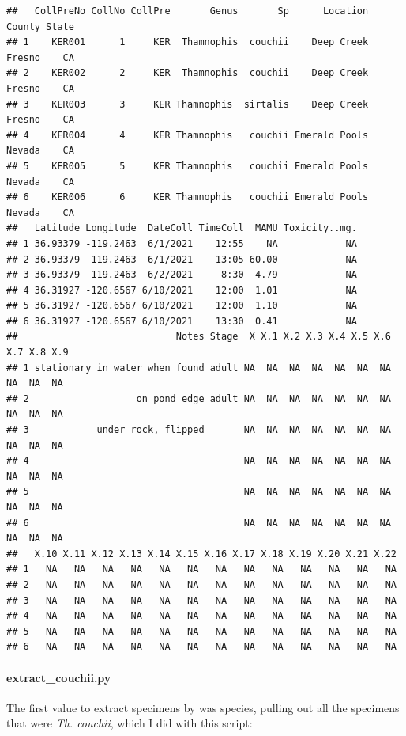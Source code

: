 \documentclass[
]{article}
\begin{document}
\begin{verbatim}
##   CollPreNo CollNo CollPre       Genus       Sp      Location County State
## 1    KER001      1     KER  Thamnophis  couchii    Deep Creek Fresno    CA
## 2    KER002      2     KER  Thamnophis  couchii    Deep Creek Fresno    CA
## 3    KER003      3     KER Thamnophis  sirtalis    Deep Creek Fresno    CA
## 4    KER004      4     KER Thamnophis   couchii Emerald Pools Nevada    CA
## 5    KER005      5     KER Thamnophis   couchii Emerald Pools Nevada    CA
## 6    KER006      6     KER Thamnophis   couchii Emerald Pools Nevada    CA
##   Latitude Longitude  DateColl TimeColl  MAMU Toxicity..mg.
## 1 36.93379 -119.2463  6/1/2021    12:55    NA            NA
## 2 36.93379 -119.2463  6/1/2021    13:05 60.00            NA
## 3 36.93379 -119.2463  6/2/2021     8:30  4.79            NA
## 4 36.31927 -120.6567 6/10/2021    12:00  1.01            NA
## 5 36.31927 -120.6567 6/10/2021    12:00  1.10            NA
## 6 36.31927 -120.6567 6/10/2021    13:30  0.41            NA
##                            Notes Stage  X X.1 X.2 X.3 X.4 X.5 X.6 X.7 X.8 X.9
## 1 stationary in water when found adult NA  NA  NA  NA  NA  NA  NA  NA  NA  NA
## 2                   on pond edge adult NA  NA  NA  NA  NA  NA  NA  NA  NA  NA
## 3            under rock, flipped       NA  NA  NA  NA  NA  NA  NA  NA  NA  NA
## 4                                      NA  NA  NA  NA  NA  NA  NA  NA  NA  NA
## 5                                      NA  NA  NA  NA  NA  NA  NA  NA  NA  NA
## 6                                      NA  NA  NA  NA  NA  NA  NA  NA  NA  NA
##   X.10 X.11 X.12 X.13 X.14 X.15 X.16 X.17 X.18 X.19 X.20 X.21 X.22
## 1   NA   NA   NA   NA   NA   NA   NA   NA   NA   NA   NA   NA   NA
## 2   NA   NA   NA   NA   NA   NA   NA   NA   NA   NA   NA   NA   NA
## 3   NA   NA   NA   NA   NA   NA   NA   NA   NA   NA   NA   NA   NA
## 4   NA   NA   NA   NA   NA   NA   NA   NA   NA   NA   NA   NA   NA
## 5   NA   NA   NA   NA   NA   NA   NA   NA   NA   NA   NA   NA   NA
## 6   NA   NA   NA   NA   NA   NA   NA   NA   NA   NA   NA   NA   NA
\end{verbatim}

\hypertarget{extract_couchii.py}{%
\paragraph{extract\_couchii.py}\label{extract_couchii.py}}

The first value to extract specimens by was species, pulling out all the
specimens that were \emph{Th. couchii}, which I did with this script:
\end{document}
